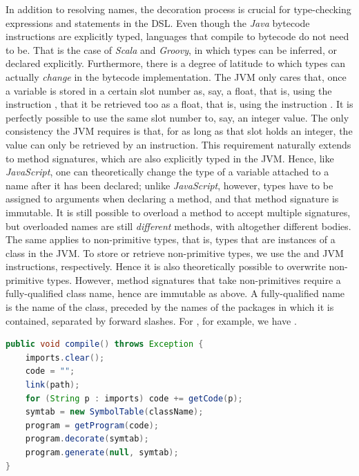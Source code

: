 In addition to resolving names, the decoration process is crucial for type-checking expressions and statements in the DSL. Even though the \emph{Java} bytecode instructions are explicitly typed, languages that compile to bytecode do not need to be. That is the case of \emph{Scala} and \emph{Groovy}, in which types can be inferred, or declared explicitly. Furthermore, there is a degree of latitude to which types can actually \emph{change} in the bytecode implementation. The JVM only cares that, once a variable is stored in a certain slot number as, say, a float, that is, using the instruction , that it be retrieved too as a float, that is, using the instruction . It is perfectly possible to use the same slot number to, say,  an integer value. The only consistency the JVM requires is that, for as long as that slot holds an integer, the value can only be retrieved by an  instruction. This requirement naturally extends to method signatures, which are also explicitly typed in the JVM. Hence, like \emph{JavaScript}, one can theoretically change the type of a variable attached to a name after it has been declared; unlike \emph{JavaScript}, however, types have to be assigned to arguments when declaring a method, and that method signature is immutable. It is still possible to overload a method to accept multiple signatures, but overloaded names are still \emph{different} methods, with altogether different bodies. The same applies to non-primitive types, that is, types that are instances of a class in the JVM. To store or retrieve non-primitive types, we use the  and  JVM instructions, respectively. Hence it is also theoretically possible to overwrite non-primitive types. However, method signatures that take non-primitives require a fully-qualified class name, hence are immutable as above. A fully-qualified name is the name of the class, preceded by the names of the packages in which it is contained, separated by forward slashes. For , for example, we have .

\begin{lstlisting}[language=Java,caption={Triggering the compilation process of a \emph{Scandal} program.},label={alg:compile}]
public void compile() throws Exception {
	imports.clear();
	code = "";
	link(path);
	for (String p : imports) code += getCode(p);
	symtab = new SymbolTable(className);
	program = getProgram(code);
	program.decorate(symtab);
	program.generate(null, symtab);
}
\end{lstlisting}

